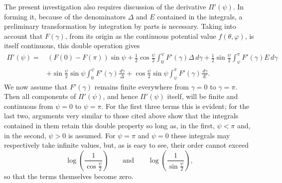 \documentclass[11pt]{article}
\newcommand{\dd}{\,d}
\begin{document}
The present investigation also requires discussion of the derivative $\Pi'(\psi)$. In forming it, because of the denominators $\Delta$ and $E$ contained in the integrals, a preliminary transformation by integration by parts is necessary. Taking into account that $F(\gamma)$, from its origin as the continuous potential value $f(\theta,\varphi)$, is itself continuous, this double operation gives
\begin{align*}
\Pi'(\psi)=&\,(F(0)-F(\pi))\sin\psi
+\frac12\cos\frac{\psi}{2}\int_0^\psi F'(\gamma)\Delta\dd\gamma
+\frac12\sin\frac{\psi}{2}\int_\psi^\pi F'(\gamma)E\dd\gamma \\
&+\sin\frac{\psi}{2}\sin\psi\int_0^\psi F'(\gamma)\frac{\dd\gamma}{\Delta}
+\cos\frac{\psi}{2}\sin\psi\int_\psi^\pi F'(\gamma)\frac{\dd\gamma}{E}.
\end{align*}
We now assume that $F'(\gamma)$ remains finite everywhere from $\gamma=0$ to $\gamma=\pi$. Then all components of $\Pi'(\psi)$, and hence $\Pi'(\psi)$ itself, will be finite and continuous from $\psi=0$ to $\psi=\pi$. For the first three terms this is evident; for the last two, arguments very similar to those cited above show that the integrals contained in them retain this double property so long as, in the first, $\psi<\pi$ and, in the second, $\psi>0$ is assumed. For $\psi=\pi$ and $\psi=0$ these integrals may respectively take infinite values, but, as is easy to see, their order cannot exceed
\[
 \log\left(\frac1{\cos\frac{\psi}{2}}\right)\qquad\text{and}\qquad
 \log\left(\frac1{\sin\frac{\psi}{2}}\right),
\]
so that the terms themselves become zero.
\end{document}
